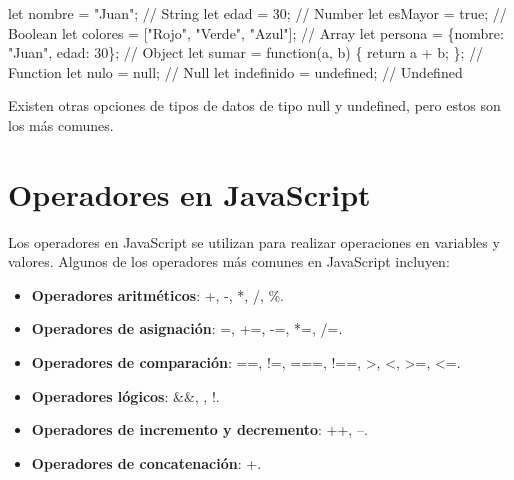 \documentclass[
  a4paper,
  DIV=11,
  numbers=noendperiod,
  onepage,
  openany]{scrreprt}
\newenvironment{Shaded}{\begin{snugshade}}{\end{snugshade}}
\newcommand{\CommentTok}[1]{\textcolor[rgb]{0.37,0.37,0.37}{#1}}
\newcommand{\ControlFlowTok}[1]{\textcolor[rgb]{0.00,0.23,0.31}{#1}}
\newcommand{\DataTypeTok}[1]{\textcolor[rgb]{0.68,0.00,0.00}{#1}}
\newcommand{\DecValTok}[1]{\textcolor[rgb]{0.68,0.00,0.00}{#1}}
\newcommand{\KeywordTok}[1]{\textcolor[rgb]{0.00,0.23,0.31}{#1}}
\newcommand{\NormalTok}[1]{\textcolor[rgb]{0.00,0.23,0.31}{#1}}
\newcommand{\OperatorTok}[1]{\textcolor[rgb]{0.37,0.37,0.37}{#1}}
\newcommand{\StringTok}[1]{\textcolor[rgb]{0.13,0.47,0.30}{#1}}
\providecommand{\tightlist}{%
  \setlength{\itemsep}{0pt}\setlength{\parskip}{0pt}}\usepackage{longtable,booktabs,array}
\begin{document}
\begin{Shaded}
\begin{Highlighting}[]
\KeywordTok{let}\NormalTok{ nombre }\OperatorTok{=} \StringTok{"Juan"}\OperatorTok{;} \CommentTok{// String}
\KeywordTok{let}\NormalTok{ edad }\OperatorTok{=} \DecValTok{30}\OperatorTok{;} \CommentTok{// Number}
\KeywordTok{let}\NormalTok{ esMayor }\OperatorTok{=} \KeywordTok{true}\OperatorTok{;} \CommentTok{// Boolean}
\KeywordTok{let}\NormalTok{ colores }\OperatorTok{=}\NormalTok{ [}\StringTok{"Rojo"}\OperatorTok{,} \StringTok{"Verde"}\OperatorTok{,} \StringTok{"Azul"}\NormalTok{]}\OperatorTok{;} \CommentTok{// Array}
\KeywordTok{let}\NormalTok{ persona }\OperatorTok{=}\NormalTok{ \{}\DataTypeTok{nombre}\OperatorTok{:} \StringTok{"Juan"}\OperatorTok{,} \DataTypeTok{edad}\OperatorTok{:} \DecValTok{30}\NormalTok{\}}\OperatorTok{;} \CommentTok{// Object}
\KeywordTok{let}\NormalTok{ sumar }\OperatorTok{=} \KeywordTok{function}\NormalTok{(a}\OperatorTok{,}\NormalTok{ b) \{ }\ControlFlowTok{return}\NormalTok{ a }\OperatorTok{+}\NormalTok{ b}\OperatorTok{;}\NormalTok{ \}}\OperatorTok{;} \CommentTok{// Function}
\KeywordTok{let}\NormalTok{ nulo }\OperatorTok{=} \KeywordTok{null}\OperatorTok{;} \CommentTok{// Null}
\KeywordTok{let}\NormalTok{ indefinido }\OperatorTok{=} \KeywordTok{undefined}\OperatorTok{;} \CommentTok{// Undefined}
\end{Highlighting}
\end{Shaded}

Existen otras opciones de tipos de datos de tipo null y undefined, pero
estos son los más comunes.

\section{Operadores en JavaScript}\label{operadores-en-javascript}

Los operadores en JavaScript se utilizan para realizar operaciones en
variables y valores. Algunos de los operadores más comunes en JavaScript
incluyen:

\begin{itemize}
\tightlist
\item
  \textbf{Operadores aritméticos}: +, -, *, /, \%.
\item
  \textbf{Operadores de asignación}: =, +=, -=, *=, /=.
\item
  \textbf{Operadores de comparación}: ==, !=, ===, !==, \textgreater,
  \textless, \textgreater=, \textless=.
\item
  \textbf{Operadores lógicos}: \&\&, \textbar\textbar, !.
\item
  \textbf{Operadores de incremento y decremento}: ++, --.
\item
  \textbf{Operadores de concatenación}: +.
\end{itemize}
\end{document}
